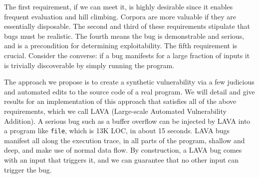 \noindent
The first requirement, if we can meet it, is highly desirable since it enables frequent evaluation and hill climbing.
Corpora are more valuable if they are essentially disposable. 
The second and third of these requirements stipulate that bugs must be realistic.
The fourth means the bug is demonstrable and serious, and is a precondition for determining exploitability. 
The fifth requirement is crucial.
Consider the converse: if a bug manifests for a large fraction of inputs it is trivially discoverable by simply running the program.

The approach we propose is to create a synthetic vulnerability via a few judicious and automated edits to the source code of a real program.
We will detail and give results for an implementation of this approach that satisfies all of the above requirements, which we call LAVA (Large-scale Automated Vulnerability Addition).
A serious bug such as a buffer overflow can be injected by LAVA into a program like \verb+file+, which is 13K LOC, in about 15 seconds.
LAVA bugs manifest all along the execution trace, in all parts of the program, shallow and deep, and make use of normal data flow.
By construction, a LAVA bug comes with an input that triggers it, and we can guarantee that no other input can trigger the bug.
